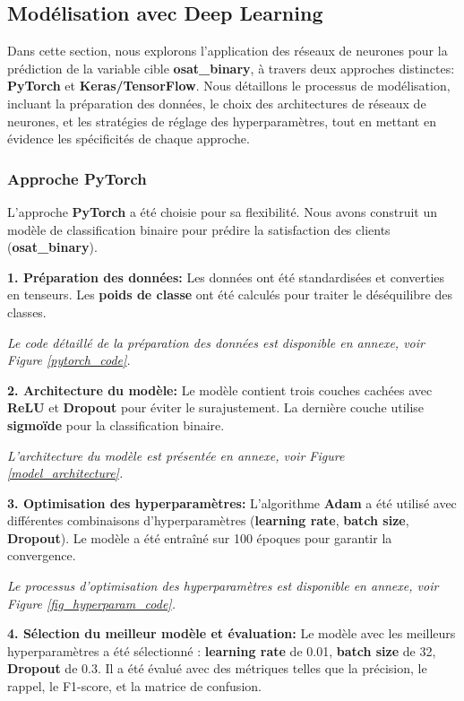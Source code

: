 \subsection{Modélisation avec Deep Learning}
Dans cette section, nous explorons l'application des réseaux de neurones pour la prédiction de la variable cible \textbf{osat\_binary}, à travers deux approches distinctes: \textbf{PyTorch} et \textbf{Keras/TensorFlow}. Nous détaillons le processus de modélisation, incluant la préparation des données, le choix des architectures de réseaux de neurones, et les stratégies de réglage des hyperparamètres, tout en mettant en évidence les spécificités de chaque approche.

\subsubsection{Approche PyTorch}
L'approche \textbf{PyTorch} a été choisie pour sa flexibilité. Nous avons construit un modèle de classification binaire pour prédire la satisfaction des clients (\textbf{osat\_binary}).

\textbf{1. Préparation des données:} Les données ont été standardisées et converties en tenseurs. Les \textbf{poids de classe} ont été calculés pour traiter le déséquilibre des classes. 

\textit{Le code détaillé de la préparation des données est disponible en annexe, voir Figure \ref{pytorch_code}.}

\textbf{2. Architecture du modèle:} Le modèle contient trois couches cachées avec \textbf{ReLU} et \textbf{Dropout} pour éviter le surajustement. La dernière couche utilise \textbf{sigmoïde} pour la classification binaire.

\textit{L'architecture du modèle est présentée en annexe, voir Figure \ref{model_architecture}.}

\textbf{3. Optimisation des hyperparamètres:} L'algorithme \textbf{Adam} a été utilisé avec différentes combinaisons d'hyperparamètres (\textbf{learning rate}, \textbf{batch size}, \textbf{Dropout}). Le modèle a été entraîné sur 100 époques pour garantir la convergence. 

\textit{Le processus d'optimisation des hyperparamètres est disponible en annexe, voir Figure \ref{fig_hyperparam_code}.}

\textbf{4. Sélection du meilleur modèle et évaluation:} Le modèle avec les meilleurs hyperparamètres a été sélectionné : \textbf{learning rate} de 0.01, \textbf{batch size} de 32, \textbf{Dropout} de 0.3. Il a été évalué avec des métriques telles que la précision, le rappel, le F1-score, et la matrice de confusion.

